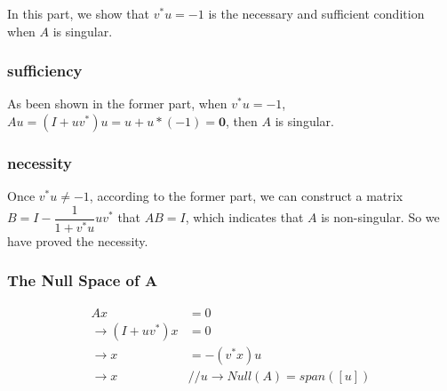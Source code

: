 In this part, we show that $v^*u = -1$ is the necessary and sufficient condition
when $A$ is singular.

\subsubsection*{sufficiency}
As been shown in the former part,
when $v^*u = -1$,
$Au = (I + uv^*)u = u + u*(-1) =  \mathbf{0}$,
then $A$ is singular.

\subsubsection*{necessity}
Once $v^*u \neq -1$, according to the former part,
we can construct a matrix $ B = I - \dfrac{1}{1+ v^*u}uv^*$
that $AB = I$, which indicates that $A$ is non-singular.
So we have proved the necessity.

\subsubsection*{The Null Space of A}
\begin{align*}
    Ax &= 0 \\
    \rightarrow (I + uv^*)x &= 0 \\
    \rightarrow x &= - (v^*x)u \\
    \rightarrow x & // u
    \rightarrow Null(A) = span([u])
\end{align*}





